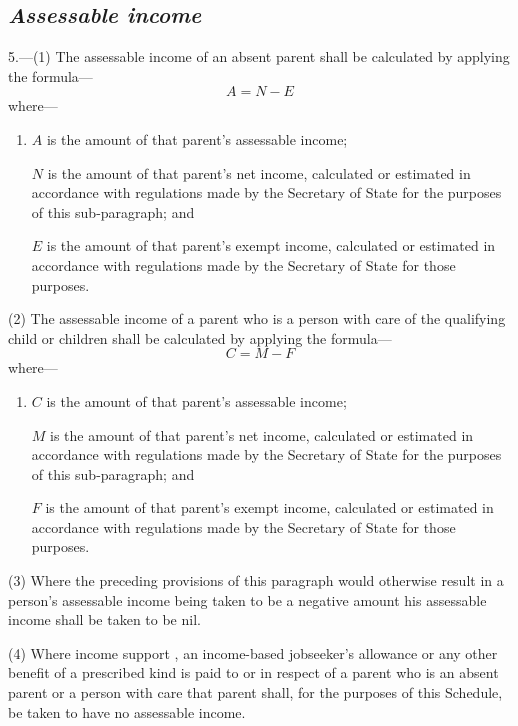 \documentclass[12pt,a4paper]{article}
\begin{document}

\subsection*{\itshape Assessable income}

5.---(1) The assessable income of an absent parent shall be calculated by applying the formula—
\[
A = N - E
\]
where—
\begin{enumerate}\item[]
    $A$ is the amount of that parent’s assessable income;

    $N$ is the amount of that parent’s net income, calculated or estimated in accordance with regulations made by the Secretary of State for the purposes of this sub-paragraph; and

    $E$ is the amount of that parent’s exempt income, calculated or estimated in accordance with regulations made by the Secretary of State for those purposes. 
\end{enumerate}

(2) The assessable income of a parent who is a person with care of the qualifying child or children shall be calculated by applying the formula—
\[
C = M - F
\]
where—
\begin{enumerate}\item[]
    $C$ is the amount of that parent’s assessable income;

    $M$ is the amount of that parent’s net income, calculated or estimated in accordance with regulations made by the Secretary of State for the purposes of this sub-paragraph; and

    $F$ is the amount of that parent’s exempt income, calculated or estimated in accordance with regulations made by the Secretary of State for those purposes. 
\end{enumerate}

(3) Where the preceding provisions of this paragraph would otherwise result in a person’s assessable income being taken to be a negative amount his assessable income shall be taken to be nil.

(4) Where income support%
, an income-based jobseeker’s allowance  %
 or any other benefit of a prescribed kind is paid to or in respect of a parent who is an absent parent or a person with care that parent shall, for the purposes of this Schedule, be taken to have no assessable income.
\end{document}

